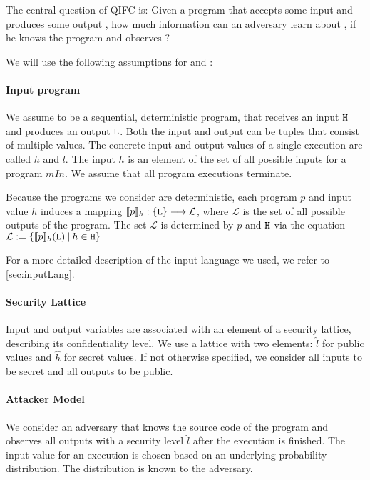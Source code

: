 The central question of QIFC is: Given a program \p that accepts some input \In and produces some output \Out, how much information can an adversary \A learn about \In, if he knows the program \p and observes \Out?

We will use the following assumptions for \p and \A:

\paragraph{Input program}\label{p:input} We assume \p to be a sequential, deterministic program, that receives an input $\mathtt{H}$ and produces an output $\mathtt{L}$. Both the input and output can be tuples that consist of multiple values. The concrete input and output values of a single execution are called $h$ and $l$. The input $h$ is an element of the set of all possible inputs for a program $mIn$. We assume that all program executions terminate.

Because the programs we consider are deterministic, each program $p$ and input value $h$ induces a mapping $\llbracket p \rrbracket_h: \{\mathtt{L}\} \longrightarrow \mathcal{L}$, where $\mathcal{L}$ is the set of all possible outputs of the program. The set $\mathcal{L}$ is determined by $p$ and $\mathtt{H}$ via the equation $\mathcal{L} := \{\llbracket p \rrbracket_h(\mathtt{L}) \: | \: h \in \mathtt{H} \}$

For a more detailed description of the input language we used, we refer to \ref{sec:inputLang}.

\paragraph{Security Lattice} Input and output variables are associated with an element of a security lattice, describing its confidentiality level. We use a lattice with two elements: $\hat{l}$ for public values and $\hat{h}$ for secret values. If not otherwise specified, we consider all inputs to be secret and all outputs to be public.

\paragraph{Attacker Model} We consider an adversary \A that knows the source code of the program \p and observes all outputs with a security level $\hat{l}$ after the execution is finished. The input value for an execution is chosen based on an underlying probability distribution. The distribution is known to the adversary.

